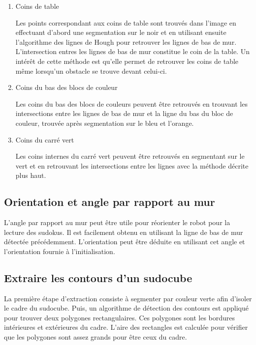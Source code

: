 \begin{enumerate}
\item{Coins de table}

Les points correspondant aux coins de table sont trouvés dans l'image en effectuant d'abord une segmentation sur le noir et en utilisant ensuite l'algorithme des lignes de Hough pour retrouver les lignes de bas de mur. L'intersection entres les lignes de bas de mur constitue le coin de la table. Un intérêt de cette méthode est qu'elle permet de retrouver les coins de table même lorsqu'un obstacle se trouve devant celui-ci.

\item{Coins du bas des blocs de couleur}

Les coins du bas des blocs de couleurs peuvent être retrouvés en trouvant les intersections entre les lignes de bas de mur et la ligne du bas du bloc de couleur, trouvée après segmentation sur le bleu et l'orange.

\item{Coins du carré vert}

Les coins internes du carré vert peuvent être retrouvés en segmentant sur le vert et en retrouvant les intersections entre les lignes avec la méthode décrite plus haut.
\end{enumerate}

\subsection{Orientation et angle par rapport au mur}

L'angle par rapport au mur peut être utile pour réorienter le robot pour la lecture des sudokus. Il est facilement obtenu en utilisant la ligne de bas de mur détectée précédemment. L'orientation peut être déduite en utilisant cet angle et l'orientation fournie à l'initialisation.

\subsection{Extraire les contours d'un sudocube}

La première étape d'extraction consiste à segmenter par couleur verte afin d'isoler le cadre du sudocube. Puis, un algorithme de détection des contours est appliqué pour trouver deux polygones rectangulaires. Ces polygones sont les bordures intérieures et extérieures du cadre. L'aire des rectangles est calculée pour vérifier que les polygones sont assez grands pour être ceux du cadre.

